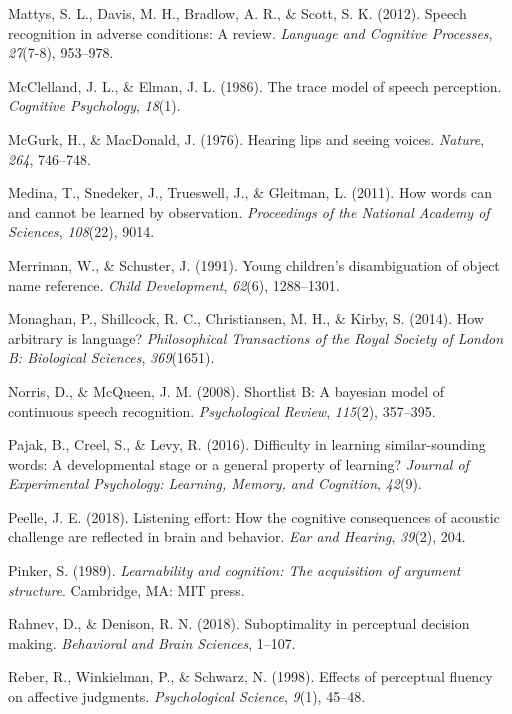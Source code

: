 \documentclass[english,,man,floatsintext]{apa6}
\theoremstyle{definition}
\theoremstyle{definition}
\theoremstyle{definition}
\theoremstyle{remark}
\begin{document}
\hypertarget{ref-mattys12}{}
Mattys, S. L., Davis, M. H., Bradlow, A. R., \& Scott, S. K. (2012).
Speech recognition in adverse conditions: A review. \emph{Language and
Cognitive Processes}, \emph{27}(7-8), 953--978.

\hypertarget{ref-mcclelland1986}{}
McClelland, J. L., \& Elman, J. L. (1986). The trace model of speech
perception. \emph{Cognitive Psychology}, \emph{18}(1).

\hypertarget{ref-mcgurk1976}{}
McGurk, H., \& MacDonald, J. (1976). Hearing lips and seeing voices.
\emph{Nature}, \emph{264}, 746--748.

\hypertarget{ref-medina2011}{}
Medina, T., Snedeker, J., Trueswell, J., \& Gleitman, L. (2011). How
words can and cannot be learned by observation. \emph{Proceedings of the
National Academy of Sciences}, \emph{108}(22), 9014.

\hypertarget{ref-Merriman91}{}
Merriman, W., \& Schuster, J. (1991). Young children's disambiguation of
object name reference. \emph{Child Development}, \emph{62}(6),
1288--1301.

\hypertarget{ref-Monaghan2014}{}
Monaghan, P., Shillcock, R. C., Christiansen, M. H., \& Kirby, S.
(2014). How arbitrary is language? \emph{Philosophical Transactions of
the Royal Society of London B: Biological Sciences}, \emph{369}(1651).

\hypertarget{ref-Norris08}{}
Norris, D., \& McQueen, J. M. (2008). Shortlist B: A bayesian model of
continuous speech recognition. \emph{Psychological Review},
\emph{115}(2), 357--395.

\hypertarget{ref-pajak2016}{}
Pajak, B., Creel, S., \& Levy, R. (2016). Difficulty in learning
similar-sounding words: A developmental stage or a general property of
learning? \emph{Journal of Experimental Psychology: Learning, Memory,
and Cognition}, \emph{42}(9).

\hypertarget{ref-peelle2018}{}
Peelle, J. E. (2018). Listening effort: How the cognitive consequences
of acoustic challenge are reflected in brain and behavior. \emph{Ear and
Hearing}, \emph{39}(2), 204.

\hypertarget{ref-pinker1989}{}
Pinker, S. (1989). \emph{Learnability and cognition: The acquisition of
argument structure}. Cambridge, MA: MIT press.

\hypertarget{ref-rahnev2018}{}
Rahnev, D., \& Denison, R. N. (2018). Suboptimality in perceptual
decision making. \emph{Behavioral and Brain Sciences}, 1--107.

\hypertarget{ref-reber98}{}
Reber, R., Winkielman, P., \& Schwarz, N. (1998). Effects of perceptual
fluency on affective judgments. \emph{Psychological Science},
\emph{9}(1), 45--48.
\end{document}
